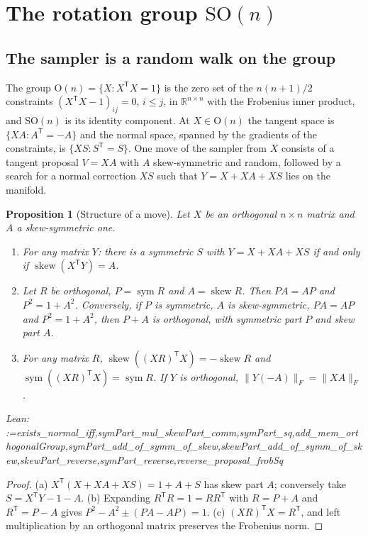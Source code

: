 \documentclass[11pt]{amsart}
\makeatletter
\newtheorem{proposition}[theorem]{Proposition}
\theoremstyle{definition}
\theoremstyle{remark}
\newcommand{\@leanlist}[1]{\def\@leansep{}\@for\@leanname:=#1\do{\@leansep
  \texttt{\expandafter\detokenize\expandafter{\@leanname}}\def\@leansep{, }}}
\newcommand{\lean}[1]{\par\smallskip\noindent
  {\footnotesize\normalfont\raggedright\textsf{Lean:} \@leanlist{#1}\par}}
\newcommand{\R}{\mathbb{R}}
\newcommand{\SO}{\mathrm{SO}}
\newcommand{\Or}{\mathrm{O}}
\newcommand{\sym}{\operatorname{sym}}
\newcommand{\skw}{\operatorname{skew}}
\newcommand{\fro}[1]{\lVert #1\rVert_{F}}
\newcommand{\transp}{^{\mathsf T}}
\makeatother
\begin{document}
\section{The rotation group \texorpdfstring{$\SO(n)$}{SO(n)}}\label{sec:son}

\subsection{The sampler is a random walk on the group}\label{sec:reduction}
The group $\Or(n)=\{X:X\transp X=1\}$ is the zero set of the $n(n+1)/2$ constraints
$(X\transp X-1)_{ij}=0$, $i\le j$, in $\R^{n\times n}$ with the Frobenius inner product, and
$\SO(n)$ is its identity component.  At $X\in\Or(n)$ the tangent space is
$\{XA:A\transp=-A\}$ and the normal space, spanned by the gradients of the constraints, is
$\{XS:S\transp=S\}$.  One move of the sampler \cite{ZHG} from $X$ consists of a tangent proposal
$V=XA$ with $A$ skew-symmetric and random, followed by a search for a normal correction $XS$
such that $Y=X+XA+XS$ lies on the manifold.

\begin{proposition}[Structure of a move]\label{prop:structure}
Let $X$ be an orthogonal $n\times n$ matrix and $A$ a skew-symmetric one.
\begin{enumerate}
\item[(a)] For any matrix $Y$: there is a symmetric $S$ with $Y=X+XA+XS$ if and only if
$\skw(X\transp Y)=A$.
\item[(b)] Let $R$ be orthogonal, $P=\sym R$ and $A=\skw R$.  Then $PA=AP$ and $P^2=1+A^2$.
Conversely, if $P$ is symmetric, $A$ is skew-symmetric, $PA=AP$ and $P^2=1+A^2$, then $P+A$ is
orthogonal, with symmetric part $P$ and skew part $A$.
\item[(c)] For any matrix $R$, $\skw((XR)\transp X)=-\skw R$ and
$\sym((XR)\transp X)=\sym R$.  If $Y$ is orthogonal, $\fro{Y(-A)}=\fro{XA}$.
\end{enumerate}
\lean{exists_normal_iff,symPart_mul_skewPart_comm,symPart_sq,add_mem_orthogonalGroup,symPart_add_of_symm_of_skew,skewPart_add_of_symm_of_skew,skewPart_reverse,symPart_reverse,reverse_proposal_frobSq}
\end{proposition}

\begin{proof}
(a) $X\transp(X+XA+XS)=1+A+S$ has skew part $A$; conversely take $S=X\transp Y-1-A$.  (b)
Expanding $R\transp R=1=RR\transp$ with $R=P+A$ and $R\transp=P-A$ gives
$P^2-A^2\pm(PA-AP)=1$.  (c) $(XR)\transp X=R\transp$, and left multiplication by an orthogonal
matrix preserves the Frobenius norm.
\end{proof}
\end{document}
